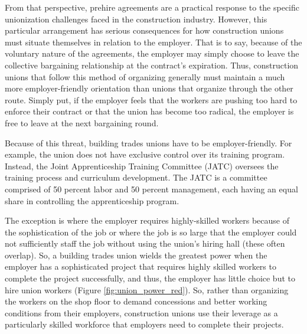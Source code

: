 \documentclass[12pt]{article}
\begin{document}
From that perspective, prehire agreements are a practical response to the specific unionization challenges faced in the construction industry. However, this particular arrangement has serious consequences for how construction unions must situate themselves in relation to the employer. That is to say, because of the voluntary nature of the agreements, the employer may simply choose to leave the collective bargaining relationship at the contract's expiration. Thus, construction unions that follow this method of organizing generally must maintain a much more employer-friendly orientation than unions that organize through the other route. Simply put, if the employer feels that the workers are pushing too hard to enforce their contract or that the union has become too radical, the employer is free to leave at the next bargaining round.

Because of this threat, building trades unions have to be employer-friendly. For example, the union does not have exclusive control over its training program. Instead, the Joint Apprenticeship Training Committee (JATC) oversees the training process and curriculum development. The JATC is a committee comprised of 50 percent labor and 50 percent management, each having an equal share in controlling the apprenticeship program. 

The exception is where the employer requires highly-skilled workers because of the sophistication of the job or where the job is so large that the employer could not sufficiently staff the job without using the union's hiring hall (these often overlap). So, a building trades union wields the greatest power when the employer has a sophisticated project that requires highly skilled workers to complete the project successfully, and thus, the employer has little choice but to hire union workers (Figure \ref{fig:union_power_red}). So, rather than organizing the workers on the shop floor to demand concessions and better working conditions from their employers, construction unions use their leverage as a particularly skilled workforce that employers need to complete their projects.
\end{document}
